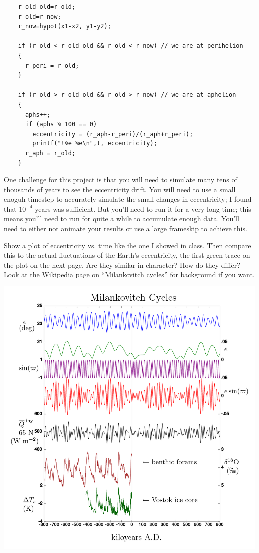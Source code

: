 \documentclass[12pt]{article}
\begin{document}
\begin{verbatim}
    r_old_old=r_old;
    r_old=r_now;
    r_now=hypot(x1-x2, y1-y2);

    if (r_old < r_old_old && r_old < r_now) // we are at perihelion
    {
      r_peri = r_old;
    }

    if (r_old > r_old_old && r_old > r_now) // we are at aphelion
    {
      aphs++;
      if (aphs % 100 == 0)
        eccentricity = (r_aph-r_peri)/(r_aph+r_peri);
        printf("!%e %e\n",t, eccentricity);
      r_aph = r_old;
    }
\end{verbatim}

One challenge for this project is that you will need to simulate many tens of thousands of years to see the eccentricity drift. You will need to use a small enoguh timestep to accurately simulate the small changes in eccentricity; I found that $10^{-4}$ years was
sufficient. But you'll need to run it for a very long time; this means you'll need to run for quite a while to accumulate enough data. You'll need to either not animate your results or use a large frameskip to achieve this.

Show a plot of eccentricity vs. time like the one I showed in class. Then compare this to the actual fluctuations of the Earth's eccentricity, the first green trace on the plot on the next page. Are they similar in character? How do they differ? Look at the 
Wikipedia page on ``Milankovitch cycles'' for background if you want.

\bigskip
\begin{center}
\includegraphics[width=6in]{milankovitch.png}
\end{center}
\end{document}
